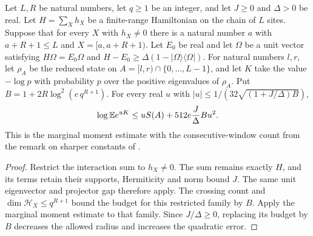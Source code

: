 \begin{lemma}
    \label{thm:chain_consecutive_window_moment}
    \leanok
    Let $L,R$ be natural numbers, let $q\ge1$ be an integer, and let
    $J\ge0$ and $\Delta>0$ be real. Let $H=\sum_X h_X$ be a
    finite-range Hamiltonian on the chain of $L$ sites. Suppose that for
    every $X$ with $h_X\ne0$ there is a natural number $a$ with
    $a+R+1\le L$ and $X=[a,a+R+1)$.
    Let $E_0$ be real and let $\Omega$ be a unit vector satisfying
    $H\Omega=E_0\Omega$ and
    $H-E_0\ge\Delta(1-|\Omega\rangle\langle\Omega|)$.
    For natural numbers $l,r$, let $\rho_A$ be the reduced state on
    $A=[l,r)\cap\{0,\ldots,L-1\}$, and let $K$ take the value $-\log p$
    with probability $p$ over the positive eigenvalues of $\rho_A$.
    Put $B=1+2R\log^2(e\,q^{R+1})$. For every real $u$ with
    $|u|\le1/(32\sqrt{(1+J/\Delta)B})$,
    \begin{align}
        \log\mathbb E e^{uK}
        \le uS(A)+512e\frac J\Delta B u^2.\notag
    \end{align}
    This is the marginal moment estimate with the consecutive-window count
    from the remark on sharper constants of
    \cite[Part~I]{TNLean2026OneDimensional}.
\end{lemma}
\begin{proof}
    \leanok
    Restrict the interaction sum to $h_X\ne0$. The sum remains exactly $H$,
    and its terms retain their supports, Hermiticity and norm bound $J$.
    The same unit eigenvector and projector gap therefore apply.
    The crossing count and $\dim\mathcal H_X\le q^{R+1}$ bound the budget
    for this restricted family by $B$. Apply the marginal moment estimate
    to that family. Since $J/\Delta\ge0$, replacing its budget by $B$
    decreases the allowed radius and increases the quadratic error.
\end{proof}

